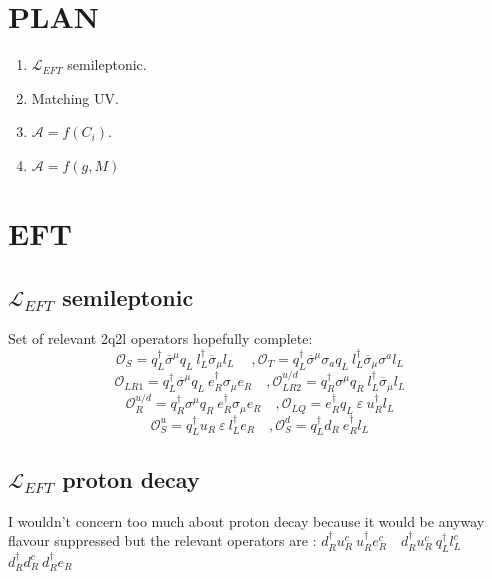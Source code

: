 \documentclass{article}
\begin{document}
\section{PLAN}
\begin{enumerate}
\item $\mathcal{L}_{EFT}$ semileptonic.
\item Matching UV.
\item $\mathcal{A}=f(C_i)$.
\item $\mathcal{A}=f(g,M)$
\end{enumerate}
\section{EFT}
\subsection{$\mathcal{L}_{EFT}$ semileptonic}
Set of relevant 2q2l operators hopefully complete:
\[ %
\mathcal{O}_S= q_L^\dagger \overline{\sigma}^\mu q_L \ l_L^\dagger \overline{\sigma}_\mu l_L \  \quad,\mathcal{O}_T=q_L^\dagger \overline{\sigma}^\mu  \sigma_a q_L \ l_L^\dagger \overline{\sigma}_\mu \sigma^a l_L
\]
\[ %
\mathcal{O}_{LR1}= q_L^\dagger \overline{\sigma}^\mu q_L \ e_R^\dagger \sigma_\mu e_R \quad, \mathcal{O}_{LR2}^{u/d}= q_R^\dagger \sigma^\mu q_R \ l_L^\dagger \overline{\sigma}_\mu l_L 
\]
\[ %
\mathcal{O}^{u/d}_R = q_R^\dagger \sigma^\mu q_R \ e_R^\dagger \sigma_\mu e_R \quad, \mathcal{O}_{LQ} = e_R^\dagger q_L \ \varepsilon \ u_R^\dagger l_L 
\]
\[
\mathcal{O}^u_S = q_L^\dagger u_R \ \varepsilon \ l_L^\dagger e_R \quad, \mathcal{O}^d_{S}= q_L^\dagger d_R \  e_R^\dagger l_L 
\]
\subsection{$\mathcal{L}_{EFT}$ proton decay}
I wouldn't concern too much about proton decay because it would be anyway flavour suppressed but the relevant operators are : $ d_R^\dagger u_R^c \ u_R^\dagger e_R^c \quad  d_R^\dagger u_R^c \ q_L^\dagger l_L^c $ $ d_R^\dagger d_R^c \ d_R^\dagger e_R $
\end{document}
